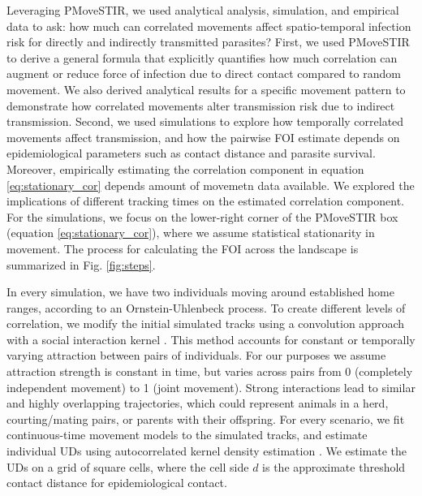 \documentclass[letterpaper]{article}
\begin{document}
Leveraging PMoveSTIR, we used analytical analysis, simulation, and empirical data to ask: how much can correlated movements affect spatio-temporal infection risk for directly and indirectly transmitted parasites? 
First, we used PMoveSTIR to derive a general formula that explicitly quantifies how much correlation can augment or reduce force of infection due to direct contact compared to random movement. We also derived analytical results for a specific movement pattern to demonstrate how correlated movements alter transmission risk due to indirect transmission.
Second, we used simulations to explore how temporally correlated movements affect  transmission, and how the pairwise FOI estimate depends on epidemiological parameters such as contact distance and parasite survival. Moreover, empirically estimating the correlation component in equation \ref{eq:stationary_cor} depends amount of movemetn data available. We explored the implications of different tracking times on the estimated correlation component. For the simulations, we focus on the lower-right corner of the PMoveSTIR box (equation \ref{eq:stationary_cor}), where we assume statistical stationarity in movement. The process for calculating the FOI across the landscape is summarized in Fig. \ref{fig:steps}.

In every simulation, we have two individuals moving around established home ranges, according to an Ornstein-Uhlenbeck process. To create different levels of correlation, we modify the initial simulated tracks using a convolution approach with a social interaction kernel \citep{Scharf2018}. This method accounts for constant or temporally varying attraction between pairs of individuals. For our purposes we assume attraction strength is constant in time, but varies across pairs from 0 (completely independent movement) to 1 (joint movement). Strong interactions lead to similar and highly overlapping trajectories, which could represent animals in a herd, courting/mating pairs, or parents with their offspring.
For every scenario, we fit continuous-time movement models to the simulated tracks, and estimate individual UDs using autocorrelated kernel density estimation \citep{Calabrese2016}. We estimate the UDs on a grid of square cells, where the cell side $d$ is the approximate threshold contact distance for epidemiological contact. 
\end{document}
